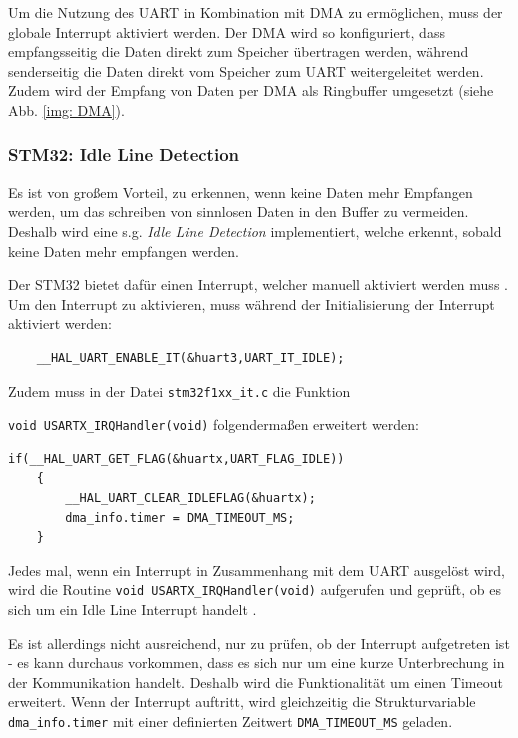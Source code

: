 Um die Nutzung des \ac{UART} in Kombination mit \ac{DMA} zu ermöglichen, muss der globale Interrupt
aktiviert werden. Der \ac{DMA} wird so konfiguriert, dass empfangsseitig die Daten direkt zum Speicher übertragen werden, während senderseitig die Daten
direkt vom Speicher zum \ac{UART} weitergeleitet werden. Zudem wird der Empfang von Daten per \ac{DMA} als Ringbuffer umgesetzt (siehe Abb. \ref{img: DMA}).



\newpage
  \subsubsection{STM32: Idle Line Detection}
  \label{subsub: Idle}

  Es ist von großem Vorteil, zu erkennen, wenn keine Daten mehr Empfangen werden, um das schreiben von sinnlosen Daten in den Buffer zu vermeiden.
  Deshalb wird eine s.g. \textit{Idle Line Detection} implementiert, welche erkennt, sobald keine Daten mehr empfangen werden.



  Der STM32 bietet dafür einen Interrupt, welcher manuell aktiviert werden muss \citep{STM32_Ref}. Um den Interrupt zu aktivieren, muss während der Initialisierung
  der Interrupt aktiviert werden:
  \begin{lstlisting}
    __HAL_UART_ENABLE_IT(&huart3,UART_IT_IDLE);
  \end{lstlisting}
  
  Zudem muss in der Datei \lstinline!stm32f1xx_it.c! die Funktion 
  
  \lstinline!void USARTX_IRQHandler(void)! folgendermaßen erweitert werden:

  \begin{lstlisting}[caption={\textit{Idle Line Interrupt}}]
    if(__HAL_UART_GET_FLAG(&huartx,UART_FLAG_IDLE))
    {
        __HAL_UART_CLEAR_IDLEFLAG(&huartx);
        dma_info.timer = DMA_TIMEOUT_MS;
    }
  \end{lstlisting}

  Jedes mal, wenn ein Interrupt in Zusammenhang mit dem \ac{UART} ausgelöst wird, wird die Routine \lstinline!void USARTX_IRQHandler(void)! 
  aufgerufen und geprüft, ob es sich um ein Idle Line Interrupt handelt \citep{STM32_Ref}. 

  \smallskip

  Es ist allerdings nicht ausreichend, nur zu prüfen, ob der Interrupt aufgetreten ist - es kann durchaus vorkommen, dass es sich nur um eine
  kurze Unterbrechung in der Kommunikation handelt. Deshalb wird die Funktionalität um einen Timeout erweitert. Wenn der Interrupt auftritt, wird
  gleichzeitig die Strukturvariable \lstinline!dma_info.timer! mit einer definierten Zeitwert \lstinline!DMA_TIMEOUT_MS! geladen.

